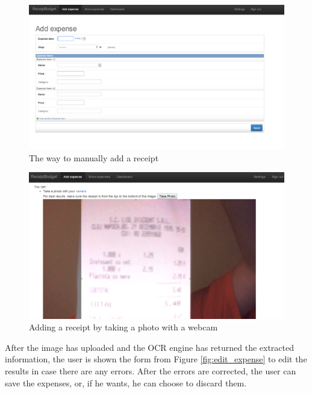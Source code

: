 \begin{figure}[htdp]
\begin{center}
\includegraphics[width=\linewidth]{img/manual/manual_add.png}
\caption{\label{fig:manual_add}
The way to manually add a receipt}
\end{center}
\end{figure}

\begin{figure}[htdp]
\begin{center}
\includegraphics[width=\linewidth]{img/manual/webcam.png}
\caption{\label{fig:webcam}
Adding a receipt by taking a photo with a webcam}
\end{center}
\end{figure}

After the image has uploaded and the OCR engine has returned the extracted information, the user is shown the form from Figure \ref{fig:edit_expense} to edit the results in case there are any errors. After the errors are corrected, the user can save the expenses, or, if he wants, he can choose to discard them. 

